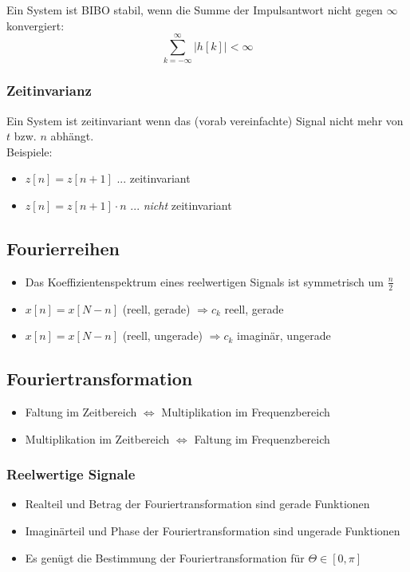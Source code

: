 \documentclass[a4paper, 12pt]{article}
\begin{document}
Ein System ist BIBO stabil, wenn die Summe der Impulsantwort nicht gegen $\infty$ konvergiert:
\[
    \sum_{k=-\infty}^{\infty} \left| h[k] \right| < \infty
\]

\subsubsection{Zeitinvarianz}

Ein System ist zeitinvariant wenn das (vorab vereinfachte) Signal nicht mehr von $t$ bzw. $n$ abhängt.\\

Beispiele:
\begin{itemize}
  \item $z[n] = z[n+1]$ ... zeitinvariant
  \item $z[n] = z[n+1]·n$ ... \emph{nicht} zeitinvariant
\end{itemize}

\subsection{Fourierreihen}

\begin{itemize}
    \item Das Koeffizientenspektrum eines reelwertigen Signals ist symmetrisch um $\frac{n}{2}$
    \item $x[n] = x[N-n]$ (reell, gerade) $⇒c_k$ reell, gerade
    \item $x[n] = x[N-n]$ (reell, ungerade) $⇒c_k$ imaginär, ungerade
\end{itemize}

\subsection{Fouriertransformation}

\begin{itemize}
    \item Faltung im Zeitbereich $⇔$ Multiplikation im Frequenzbereich
    \item Multiplikation im Zeitbereich $⇔$ Faltung im Frequenzbereich
\end{itemize}

\subsubsection{Reelwertige Signale}

\begin{itemize}
    \item Realteil und Betrag der Fouriertransformation sind gerade Funktionen
    \item Imaginärteil und Phase der Fouriertransformation sind ungerade Funktionen
    \item Es genügt die Bestimmung der Fouriertransformation für $Θ ∈ [0,π]$
\end{itemize}
\end{document}

